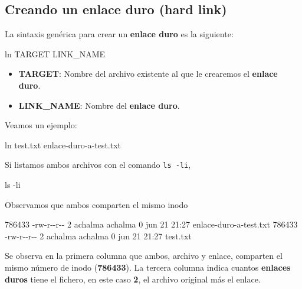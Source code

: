 \documentclass[
  jou,
  floatsintext,
  longtable,
  a4paper,
  nolmodern,
  notxfonts,
  notimes,
  12pt,
  colorlinks=true,linkcolor=blue,citecolor=blue,urlcolor=blue]{apa7}
\newenvironment{Shaded}{\begin{snugshade}}{\end{snugshade}}
\newcommand{\AttributeTok}[1]{\textcolor[rgb]{0.40,0.45,0.13}{#1}}
\newcommand{\ExtensionTok}[1]{\textcolor[rgb]{0.00,0.23,0.31}{#1}}
\newcommand{\FunctionTok}[1]{\textcolor[rgb]{0.28,0.35,0.67}{#1}}
\newcommand{\NormalTok}[1]{\textcolor[rgb]{0.00,0.23,0.31}{#1}}
\providecommand{\tightlist}{%
  \setlength{\itemsep}{0pt}\setlength{\parskip}{0pt}}
\begin{document}
\subsection{Creando un enlace duro (hard
link)}\label{creando-un-enlace-duro-hard-link}

La sintaxis genérica para crear un \textbf{enlace duro} es la siguiente:

\begin{Shaded}
\begin{Highlighting}[]
\FunctionTok{ln}\NormalTok{ TARGET LINK\_NAME}
\end{Highlighting}
\end{Shaded}

\begin{itemize}
\tightlist
\item
  \textbf{TARGET}: Nombre del archivo existente al que le crearemos el
  \textbf{enlace duro}.
\item
  \textbf{LINK\_NAME}: Nombre del \textbf{enlace duro}.
\end{itemize}

Veamos un ejemplo:

\begin{Shaded}
\begin{Highlighting}[]
\FunctionTok{ln}\NormalTok{ test.txt enlace{-}duro{-}a{-}test.txt}
\end{Highlighting}
\end{Shaded}

Si listamos ambos archivos con el comando \texttt{ls\ -li},

\begin{Shaded}
\begin{Highlighting}[]
\FunctionTok{ls} \AttributeTok{{-}li}
\end{Highlighting}
\end{Shaded}

Observamos que ambos comparten el mismo inodo

\begin{Shaded}
\begin{Highlighting}[]
\ExtensionTok{786433} \AttributeTok{{-}rw{-}r{-}{-}r{-}{-}}\NormalTok{ 2 achalma achalma 0 jun 21 21:27 enlace{-}duro{-}a{-}test.txt}
\ExtensionTok{786433} \AttributeTok{{-}rw{-}r{-}{-}r{-}{-}}\NormalTok{ 2 achalma achalma 0 jun 21 21:27 test.txt}
\end{Highlighting}
\end{Shaded}

Se observa en la primera columna que ambos, archivo y enlace, comparten
el mismo número de inodo (\textbf{786433}). La tercera columna indica
cuantos \textbf{enlaces duros} tiene el fichero, en este caso
\textbf{2}, el archivo original más el enlace.
\end{document}
